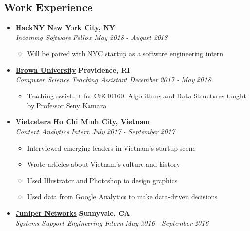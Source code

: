 \documentclass[10pt,letterpaper]{article}
\begin{document}
\subsection*{Work Experience}
  \begin{itemize}
    \parskip=-0.5em

    \item[]
    {\href{https://apply.hackny.org/}{\textbf{HackNY}} \hfill
      \textbf{New York City, NY}}
    \\
    {\emph{Incoming Software Fellow} \hfill \emph{May 2018 - August 2018}}

    \begin{itemize}[label=\textbullet]
      \itemsep0em
      \item Will be paired with NYC startup as a software engineering intern
    \end{itemize}


    \item[]
    {\href{https://www.brown.edu/}{\textbf{Brown University}} \hfill
      \textbf{Providence, RI}}
    \\
    {\emph{Computer Science Teaching Assistant} \hfill \emph{December 2017 - May 2018}}

    \begin{itemize}[label=\textbullet]
      \itemsep0em
      \item Teaching assistant for CSCI0160: Algorithms and Data Structures taught by Professor Seny Kamara
    \end{itemize}

    \item[]
    {\href{http://vietcetera.com/}{\textbf{Vietcetera}} \hfill
      \textbf{Ho Chi Minh City, Vietnam}}
    \\
    {\emph{Content Analytics Intern} \hfill \emph{July 2017 - September 2017}}

    \begin{itemize}[label=\textbullet]
      \itemsep0em
      \item Interviewed emerging leaders in Vietnam's startup scene
      \item Wrote articles about Vietnam's culture and history
      \item Used Illustrator and Photoshop to design graphics
      \item Used data from Google Analytics to make data-driven decisions
    \end{itemize}

    \item[]
    {\href{https://www.juniper.net/us/en/}{\textbf{Juniper Networks}} \hfill
      \textbf{Sunnyvale, CA}}
    \\
    {\emph{Systems Support Engineering Intern} \hfill \emph{May 2016 - September 2016}}


\end{itemize}
\end{document}
